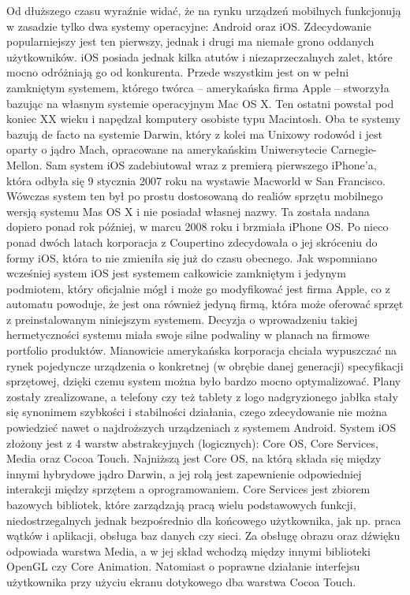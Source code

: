 Od dłuższego czasu wyraźnie widać, że na rynku urządzeń mobilnych funkcjonują w zasadzie tylko dwa systemy operacyjne: Android oraz iOS. Zdecydowanie popularniejszy jest ten pierwszy, jednak i drugi ma niemałe grono oddanych użytkowników. iOS posiada jednak kilka atutów i niezaprzeczalnych zalet, które mocno odróżniają go od konkurenta. Przede wszystkim jest on w pełni zamkniętym systemem, którego twórca – amerykańska firma Apple – stworzyła bazując na własnym systemie operacyjnym Mac OS X. Ten ostatni powstał pod koniec XX wieku i napędzał komputery osobiste typu Macintosh. Oba te systemy bazują de facto na systemie Darwin, który z kolei ma Unixowy rodowód i jest oparty o jądro Mach, opracowane na amerykańskim Uniwersytecie Carnegie-Mellon. 
Sam system iOS zadebiutował wraz z premierą pierwszego iPhone'a, która odbyła się 9 stycznia 2007 roku na wystawie Macworld w San Francisco. Wówczas system ten był po prostu dostosowaną do realiów sprzętu mobilnego wersją systemu Mas OS X i nie posiadał własnej nazwy. Ta została nadana dopiero ponad rok później, w marcu 2008 roku i brzmiała iPhone OS. Po nieco ponad dwóch latach korporacja z Coupertino zdecydowała o jej skróceniu do formy iOS, która to nie zmieniła się już do czasu obecnego.
Jak wspomniano wcześniej system iOS jest systemem całkowicie zamkniętym i jedynym podmiotem, który oficjalnie mógł i może go modyfikować jest firma Apple, co z automatu powoduje, że jest ona również jedyną firmą, która może oferować sprzęt z preinstalowanym niniejszym systemem. Decyzja o wprowadzeniu takiej hermetyczności systemu miała swoje silne podwaliny w planach na firmowe portfolio produktów. Mianowicie amerykańska korporacja chciała wypuszczać na rynek pojedyncze urządzenia o konkretnej (w obrębie danej generacji) specyfikacji sprzętowej, dzięki czemu system można było bardzo mocno optymalizować. Plany zostały zrealizowane, a telefony czy też tablety z logo nadgryzionego jabłka stały się synonimem szybkości i stabilności działania, czego zdecydowanie nie można powiedzieć nawet o najdroższych urządzeniach z systemem Android.
System iOS złożony jest z 4 warstw abstrakcyjnych (logicznych): Core OS, Core Services, Media oraz Cocoa Touch. Najniższą jest Core OS, na którą składa się między innymi hybrydowe jądro Darwin, a jej rolą jest zapewnienie odpowiedniej interakcji między sprzętem a oprogramowaniem. Core Services jest zbiorem bazowych bibliotek, które zarządzają pracą wielu podstawowych funkcji,  niedostrzegalnych jednak bezpośrednio dla końcowego użytkownika, jak np. praca wątków i aplikacji, obsługa baz danych czy sieci. Za obsługę obrazu oraz dźwięku odpowiada warstwa Media, a w jej skład wchodzą między innymi biblioteki OpenGL czy Core Animation. Natomiast o poprawne działanie interfejsu użytkownika przy użyciu ekranu dotykowego dba warstwa Cocoa Touch. 


